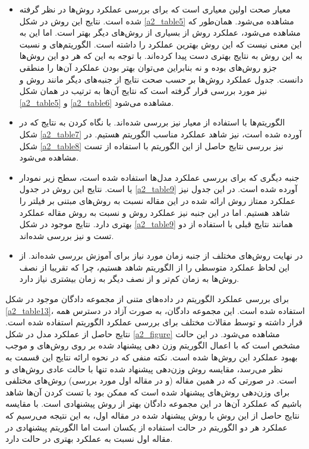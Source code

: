 \documentclass[12pt, a4paper]{article}
\begin{document}
\begin{itemize}
    \item معیار صحت اولین معیاری است که برای بررسی عملکرد روش‌ها در نظر گرفته شده است.
          نتایج این روش در شکل \ref{a2_table5} مشاهده می‌شود.
          همان‌طور که مشاهده می‌شود، عملکرد روش  از بسیاری از روش‌های دیگر بهتر است.
          اما این به این معنی نیست که این روش بهترین عملکرد را داشته است. الگوریتم‌های
           و  نسبت به این روش به نتایج بهتری دست پیدا کرده‌اند.
          با توجه به این که هر دو این روش‌ها جزو روش‌های  بوده و نه
           بنابراین می‌توان بهتر بودن عملکرد آن‌ها را منطقی دانست.
          جدول عملکرد روش‌ها بر حسب صحت نتایج از جنبه‌های دیگر مانند روش  و
           نیز مورد بررسی قرار گرفته است که نتایج آن‌ها به ترتیب
          در همان شکل \ref{a2_table5} و \ref{a2_table6} مشاهده می‌شود.
    \item الگوریتم‌ها با استفاده از معیار 
          نیز بررسی شده‌اند. با نگاه کردن به نتایج که در شکل‌ \ref{a2_table7}
          آورده شده است، نیز شاهد عملکرد مناسب الگوریتم هستیم. در شکل
          \ref{a2_table8} نیز بررسی نتایج حاصل از این الگوریتم با استفاده از تست
           مشاهده می‌شود.
    \item جنبه دیگری که برای بررسی عملکرد مدل‌ها استفاده شده است، سطح زیر نمودار
          یا  است. نتایج این روش در جدول \ref{a2_table9} آورده شده است.
          در این جدول نیز عملکرد ممتاز روش ارائه شده در این مقاله نسبت به روش‌های
          مبتنی بر فیلتر را شاهد هستیم. اما در این جنبه نیز عملکرد روش  و
           نسبت به روش مقاله عملکرد بهتری دارد. نتایج موجود در شکل \ref{a2_table9}
          همانند نتایج قبلی با استفاده از دو تست  و  نیز
          بررسی شده‌اند.
    \item در نهایت روش‌های مختلف از جنبه زمان مورد نیاز برای آموزش بررسی شده‌اند.
          از این لحاظ عملکرد متوسطی را از الگوریتم شاهد هستیم، چرا که تقریبا از نصف روش‌ها
          به زمان کم‌تر و از نصف دیگر به زمان بیشتری نیاز دارد.
\end{itemize}

برای بررسی عملکرد الگوریتم در داده‌های متنی از مجموعه دادگان موجود در شکل
\ref{a2_table13}، استفاده شده است. این مجموعه دادگان، به صورت آزاد در دسترس
همه قرار داشته و توسط مقالات مختلف برای بررسی عملکرد الگوریتم استفاده شده است.
نتایج حاصل از عملکرد مدل در شکل \ref{a2_figure} مشاهده می‌شود. در این حالت
مشخص است که با اعمال الگوریتم وزن دهی پیشنهاد شده بر روی روش‌های
 و  موجب بهبود عملکرد این روش‌ها شده است. نکته منفی که در نحوه ارائه نتایج این قسمت
به نظر می‌رسد، مقایسه روش وزن‌دهی پیشنهاد شده تنها با حالت عادی روش‌های 
و  است. در صورتی که در همین مقاله (و در مقاله اول مورد بررسی) روش‌های
مختلفی برای وزن‌دهی روش‌های  پیشنهاد شده است که ممکن بود با تست کردن
آن‌ها شاهد باشیم که عملکرد آن‌ها در این مجموعه دادگان بهتر از روش پیشنهادی است.
با مقایسه نتایج حاصل از این روش با روش پیشنهاد شده در مقاله اول، به این نتیجه می‌رسیم که
عملکرد هر دو الگوریتم در حالت استفاده از  یکسان است اما الگوریتم پیشنهادی در
مقاله اول نسبت به  عملکرد بهتری در حالت  دارد.
\end{document}
